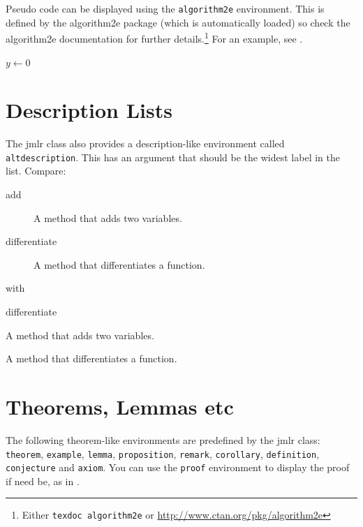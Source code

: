 \documentclass[pmlr,twocolumn]{jmlr} %
\begin{document}
Pseudo code can be displayed using the \texttt{algorithm2e}
environment. This is defined by the \textsf{algorithm2e} package
(which is automatically loaded) so check the \textsf{algorithm2e}
documentation for further details.\footnote{Either \texttt{texdoc
algorithm2e} or \url{http://www.ctan.org/pkg/algorithm2e}}
For an example, see .

\begin{algorithm2e}
\caption{Computing Net Activation}
\label{alg:net}
{}
$y\leftarrow 0$\;
\end{algorithm2e}

\section{Description Lists}

The \textsf{jmlr} class also provides a description-like 
environment called \texttt{altdescription}. This has an
argument that should be the widest label in the list. Compare:
\begin{description}
\item[add] A method that adds two variables.
\item[differentiate] A method that differentiates a function.
\end{description}
with
\begin{altdescription}{differentiate}
\item[add] A method that adds two variables.
\item[differentiate] A method that differentiates a function.
\end{altdescription}

\section{Theorems, Lemmas etc}
\label{sec:theorems}

The following theorem-like environments are predefined by
the \textsf{jmlr} class: \texttt{theorem}, \texttt{example},
\texttt{lemma}, \texttt{proposition}, \texttt{remark}, 
\texttt{corollary}, \texttt{definition}, \texttt{conjecture}
and \texttt{axiom}. You can use the \texttt{proof} environment
to display the proof if need be, as in .
\end{document}
